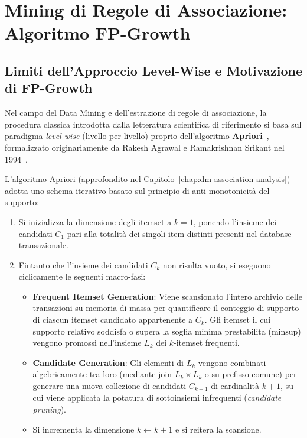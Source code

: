\chapter{Mining di Regole di Associazione: Algoritmo FP-Growth}
\label{chap:dm-fp-growth-clustering-gsp}


\FloatBarrier
\section{Limiti dell'Approccio Level-Wise e Motivazione di FP-Growth}
\label{sec:dm-fp-motivation}

Nel campo del Data Mining e dell'estrazione di regole di associazione, la procedura classica introdotta dalla letteratura scientifica di riferimento si basa sul paradigma \textit{level-wise} (livello per livello) proprio dell'algoritmo \textbf{Apriori}~\cite{tan2018, agrawal1994}, formalizzato originariamente da Rakesh Agrawal e Ramakrishnan Srikant nel 1994~\cite{agrawal1994}.

L'algoritmo Apriori (approfondito nel Capitolo~\ref{chap:dm-association-analysis}) adotta uno schema iterativo basato sul principio di anti-monotonicità del supporto:
\begin{enumerate}[label=\textbf{\arabic*.}]
    \item Si inizializza la dimensione degli itemset a $k=1$, ponendo l'insieme dei candidati $C_1$ pari alla totalità dei singoli item distinti presenti nel database transazionale.
    \item Fintanto che l'insieme dei candidati $C_k$ non risulta vuoto, si eseguono ciclicamente le seguenti macro-fasi:
    \begin{itemize}
        \item \textbf{Frequent Itemset Generation}: Viene scansionato l'intero archivio delle transazioni su memoria di massa per quantificare il conteggio di supporto di ciascun itemset candidato appartenente a $C_k$. Gli itemset il cui supporto relativo soddisfa o supera la soglia minima prestabilita ($\text{minsup}$) vengono promossi nell'insieme $L_k$ dei $k$-itemset frequenti.
        \item \textbf{Candidate Generation}: Gli elementi di $L_k$ vengono combinati algebricamente tra loro (mediante join $L_k \times L_k$ o su prefisso comune) per generare una nuova collezione di candidati $C_{k+1}$ di cardinalità $k+1$, su cui viene applicata la potatura di sottoinsiemi infrequenti (\textit{candidate pruning}).
        \item Si incrementa la dimensione $k \leftarrow k+1$ e si reitera la scansione.
    \end{itemize}
\end{enumerate}

